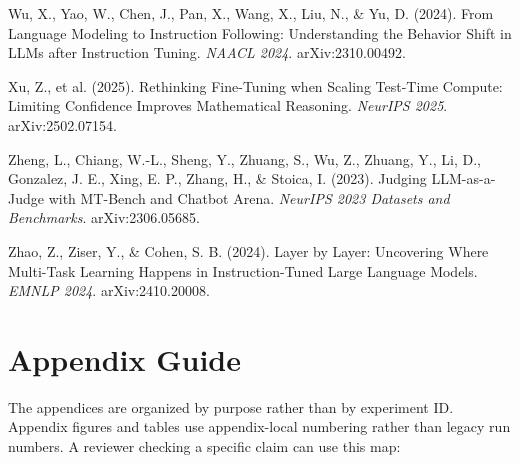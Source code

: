 \documentclass[11pt]{article}
\begin{document}
Wu, X., Yao, W., Chen, J., Pan, X., Wang, X., Liu, N., \& Yu, D. (2024). From Language Modeling to Instruction Following: Understanding the Behavior Shift in LLMs after Instruction Tuning. \emph{NAACL 2024}. arXiv:2310.00492.

Xu, Z., et al. (2025). Rethinking Fine-Tuning when Scaling Test-Time Compute: Limiting Confidence Improves Mathematical Reasoning. \emph{NeurIPS 2025}. arXiv:2502.07154.

Zheng, L., Chiang, W.-L., Sheng, Y., Zhuang, S., Wu, Z., Zhuang, Y., Li, D., Gonzalez, J. E., Xing, E. P., Zhang, H., \& Stoica, I. (2023). Judging LLM-as-a-Judge with MT-Bench and Chatbot Arena. \emph{NeurIPS 2023 Datasets and Benchmarks}. arXiv:2306.05685.

Zhao, Z., Ziser, Y., \& Cohen, S. B. (2024). Layer by Layer: Uncovering Where Multi-Task Learning Happens in Instruction-Tuned Large Language Models. \emph{EMNLP 2024}. arXiv:2410.20008.


\appendix
\setcounter{figure}{0}
\setcounter{table}{0}
\renewcommand{\thefigure}{\thesection.\arabic{figure}}
\renewcommand{\thetable}{\thesection.\arabic{table}}
\section*{Appendix Guide}

The appendices are organized by purpose rather than by experiment ID. Appendix figures and tables use appendix-local numbering rather than legacy run numbers. A reviewer checking a specific claim can use this map:
\end{document}
